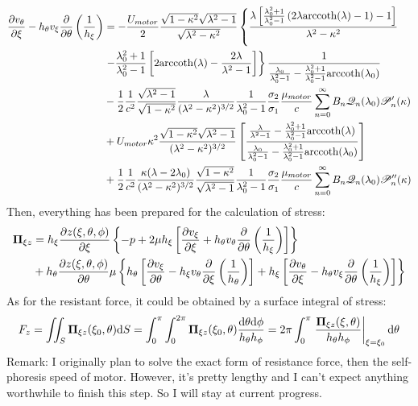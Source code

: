 \documentclass[fontsize=11pt, %
                             paper=a4, %
                             twoside, %
                             captions=tableheading,
                             index=totoc,
                             hyperref]{labbook}
\begin{document}
\begin{equation}
\begin{aligned}
\frac{\partial v_\theta}{\partial \xi}-h_\theta v_\xi \frac{\partial }{\partial \theta}\left(\frac{1}{h_\xi}\right)&=-\frac{U_{motor}}{2}\frac{\sqrt{1-\kappa^2}\sqrt{\lambda^2-1}}{\sqrt{\lambda^2-\kappa^2}}\left\{\frac{\lambda\left[\frac{\lambda_0^2+1}{\lambda_0^2-1}\left(2\lambda\mathrm{arccoth}(\lambda)-1\right)-1\right]}{\lambda^2-\kappa^2}\right.\\
&\left. -\frac{\lambda_0^2+1}{\lambda_0^2-1}\left[2\mathrm{arccoth}(\lambda)-\frac{2\lambda}{\lambda^2-1}\right]\right\}
\frac{1}{\frac{\lambda_0}{\lambda_0^2-1}-\frac{\lambda_0^2+1}{\lambda_0^2-1}\mathrm{arccoth}(\lambda_0)}\\
&-\frac{1}{2}\frac{1}{c^2}\frac{\sqrt{\lambda^2-1}}{\sqrt{1-\kappa^2}}\frac{\lambda}{(\lambda^2-\kappa^2)^{3/2}}\frac{1}{\lambda_0^2-1}\frac{\sigma_2}{\sigma_1}\frac{\mu_{motor}}{c}\sum_{n=0}^\infty B_n \mathscr{Q}_n(\lambda_0)\mathscr{P}_n^\prime(\kappa)\\
&+U_{motor}\kappa^2\frac{\sqrt{1-\kappa^2}\sqrt{\lambda^2-1}}{(\lambda^2-\kappa^2)^{3/2}}\left[\frac{\frac{\lambda}{\lambda^2-1}-\frac{\lambda_0^2+1}{\lambda_0^2-1}\mathrm{arccoth}(\lambda)}{\frac{\lambda_0}{\lambda_0^2-1}-\frac{\lambda_0^2+1}{\lambda_0^2-1}\mathrm{arccoth}(\lambda_0)}\right]\\
&+\frac{1}{2}\frac{1}{c^2}\frac{\kappa(\lambda-2\lambda_0)}{(\lambda^2-\kappa^2)^{3/2}}\frac{\sqrt{1-\kappa^2}}{\sqrt{\lambda^2-1}}\frac{1}{\lambda_0^2-1}\frac{\sigma_2}{\sigma_1}\frac{\mu_{motor}}{c}\sum_{n=0}^\infty B_n \mathscr{Q}_n(\lambda_0)\mathscr{P}_n^{\prime\prime}(\kappa)
\end{aligned}
\end{equation}
Then, everything has been prepared for the calculation of stress:
\begin{equation}
\begin{aligned}
\mbox{\boldmath$ \Pi $}_{\xi z}&=
h_\xi\frac{\partial z(\xi,\theta,\phi)}{\partial \xi} \left\{-p+2\mu h_\xi \left[\frac{\partial v_\xi}{\partial \xi}+h_\theta v_\theta \frac{\partial }{\partial \theta}\left(\frac{1}{h_\xi}\right)\right]\right\}\\
&+h_\theta\frac{\partial z(\xi,\theta,\phi)}{\partial \theta} \mu \left\{h_\theta\left[\frac{\partial v_\xi}{\partial \theta}-h_\xi v_\theta \frac{\partial }{\partial \xi}\left(\frac{1}{h_\theta}\right)\right]+h_\xi\left[\frac{\partial v_\theta}{\partial \xi}-h_\theta v_\xi \frac{\partial }{\partial \theta}\left(\frac{1}{h_\xi}\right)\right]\right\}\\
\end{aligned}
\end{equation}
As for the resistant force, it could be obtained by a surface integral of stress:
\begin{equation}
F_z=\iint_S\mbox{\boldmath$ \Pi $}_{\xi z}(\xi_0,\theta)\mathrm{d}S=\int_0^\pi\int_0^{2\pi} \mbox{\boldmath$ \Pi $}_{\xi z}(\xi_0,\theta)\frac{\mathrm{d}\theta\mathrm{d}\phi}{h_\theta h_\phi}=2\pi\int_0^\pi \left.\frac{\mbox{\boldmath$ \Pi $}_{\xi z}(\xi,\theta)}{h_\theta h_\phi}\right|_{\xi=\xi_0}\mathrm{d}\theta
\end{equation}
Remark:
I originally plan to solve the exact form of resistance force, then the self-phoresis speed of motor. However, it's pretty lengthy and I can't expect anything worthwhile to finish this step. So I will stay at current progress.
\end{document}
